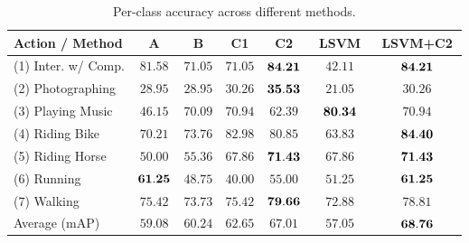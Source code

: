 \documentclass{bmvc2k}
\newcommand{\parnspc}{\vspace*{-4.2mm}}
\newcommand{\tfs}{\small}   %
\newcommand{\cfs}{\small}   %
\begin{document}
\begin{small}
\begin{table}[tbp]
\centering
{}
\begin{tabular}{|l|c|c|c|c||c||c|}
\hline
\tfs Action /  Method & \tfs$~~$A$~~$ & \tfs$~~$B$~~$ & \tfs$~~$C1$~~$ & \tfs$~~$C2$~~$ & \tfs$~~$LSVM$~~$ & \tfs$~$LSVM+C2$~$ \\ \hline 
\tfs(1) Inter. w/ Comp. & \tfs$81.58$ & \tfs$71.05$ & \tfs$71.05$ & \tfs${\bf 84.21}$ & \tfs$42.11$ & \tfs${\bf 84.21}$\\ \hline 
\tfs(2) Photographing   & \tfs$28.95$ & \tfs$28.95$ & \tfs$30.26$ & \tfs${\bf 35.53}$ & \tfs$21.05$ & \tfs$30.26$\\ \hline 
\tfs(3) Playing Music   & \tfs$46.15$ & \tfs$70.09$ & \tfs$70.94$ & \tfs$62.39$ & \tfs${\bf 80.34}$ & \tfs$70.94$\\ \hline 
\tfs(4) Riding Bike     & \tfs$70.21$ & \tfs$73.76$ & \tfs$82.98$ & \tfs$80.85$ & \tfs$63.83$ & \tfs${\bf 84.40}$\\ \hline 
\tfs(5) Riding Horse    & \tfs$50.00$ & \tfs$55.36$ & \tfs$67.86$ & \tfs${\bf 71.43}$ & \tfs$67.86$ & \tfs${\bf 71.43}$\\ \hline 
\tfs(6) Running         & \tfs${\bf 61.25}$ & \tfs$48.75$ & \tfs$40.00$ & \tfs$55.00$ & \tfs$51.25$ & \tfs${\bf 61.25}$\\ \hline 
\tfs(7) Walking         & \tfs$75.42$ & \tfs$73.73$ & \tfs$75.42$ & \tfs${\bf 79.66}$ & \tfs$72.88$ & \tfs$78.81$\\ \hline  \hline
\tfs Average (mAP)      & \tfs$59.08$ & \tfs$60.24$ & \tfs$62.65$ & \tfs$67.01$ & \tfs$57.05$ & \tfs${\bf 68.76}$\\ \hline 
\end{tabular}
\caption{\cfs Per-class accuracy across different methods. \normalsize}
\label{tab:per_class}
\end{table}
\end{small}


\parnspc
\end{document}
